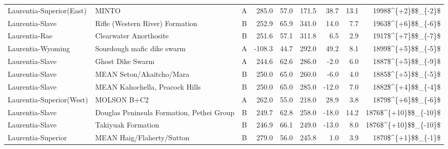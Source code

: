 \begin{longtable}{p{1 in}p{1 in}rrrrrrr}
      Laurentia-Superior(East) &                                              MINTO &      A &     285.0 &      57.0 & 171.5 &  38.7 &      13.1 &     1998\$\textasciicircum \{+2\}\$\$\_\{-2\}\$ \\
               Laurentia-Slave &                    Rifle (Western River) Formation &      B &     252.9 &      65.9 & 341.0 &  14.0 &       7.7 &     1963\$\textasciicircum \{+6\}\$\$\_\{-6\}\$ \\
                 Laurentia-Rae &                             Clearwater Anorthosite &      B &     251.6 &      57.1 & 311.8 &   6.5 &       2.9 &     1917\$\textasciicircum \{+7\}\$\$\_\{-7\}\$ \\
             Laurentia-Wyoming &                         Sourdough mafic dike swarm &      A &    -108.3 &      44.7 & 292.0 &  49.2 &       8.1 &     1899\$\textasciicircum \{+5\}\$\$\_\{-5\}\$ \\
               Laurentia-Slave &                                   Ghost Dike Swarm &      A &     244.6 &      62.6 & 286.0 &  -2.0 &       6.0 &     1887\$\textasciicircum \{+5\}\$\$\_\{-9\}\$ \\
               Laurentia-Slave &                           MEAN Seton/Akaitcho/Mara &      B &     250.0 &      65.0 & 260.0 &  -6.0 &       4.0 &     1885\$\textasciicircum \{+5\}\$\$\_\{-5\}\$ \\
               Laurentia-Slave &                     MEAN Kahochella, Peacock Hills &      B &     250.0 &      65.0 & 285.0 & -12.0 &       7.0 &     1882\$\textasciicircum \{+4\}\$\$\_\{-4\}\$ \\
      Laurentia-Superior(West) &                                        MOLSON B+C2 &      A &     262.0 &      55.0 & 218.0 &  28.9 &       3.8 &     1879\$\textasciicircum \{+6\}\$\$\_\{-6\}\$ \\
               Laurentia-Slave &          Douglas Peninsula Formation, Pethei Group &      B &     249.7 &      62.8 & 258.0 & -18.0 &      14.2 &   1876\$\textasciicircum \{+10\}\$\$\_\{-10\}\$ \\
               Laurentia-Slave &                                 Takiyuak Formation &      B &     246.9 &      66.1 & 249.0 & -13.0 &       8.0 &   1876\$\textasciicircum \{+10\}\$\$\_\{-10\}\$ \\
            Laurentia-Superior &                          MEAN Haig/Flaherty/Sutton &      B &     279.0 &      56.0 & 245.8 &   1.0 &       3.9 &     1870\$\textasciicircum \{+1\}\$\$\_\{-1\}\$ \\

\end{longtable}
